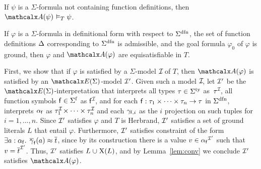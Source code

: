 \begin{lemma}\label{lem:conv2}
If $\psi$ is a $\Sigma$-formula not containing function definitions, 
then $\conv( \psi ) \models_T\psi$.
\end{lemma}

\begin{theorem}\label{thm:equi}
If $\varphi$ is a\/ $\Sigma$-formula in definitional form with respect to\/
$\sfundefs{\Sigma}$,
the set of function definitions\/ $\DDD$ corresponding to\/
$\sfundefs{\Sigma}$ is admissible, 
and the goal formula $\varphi_0$ of $\varphi$ is ground,
then\/ $\varphi$ and\/ $\conv( \varphi )$ are
equisatisfiable in $T$.
\end{theorem}
\begin{proofsketch}
First, we show that if $\varphi$ is satisfied by a
$\Sigma$-model $\mathcal{I\!}$ of $T$, then $\conv( \varphi )$ is satisfied by an $\extendsig{\Sigma}$-model ${\mathcal{I}'}$.
Given such a model $\mathcal{I\!}$, let ${\mathcal{I}'}$ be the $\extendsig{\Sigma}$-interpretation that interprets all types $\tau \in \stypes{\Sigma}$ as~$\tau^{\mathcal{I\!}}$,
all function symbols $\con{f} \in \sfuns{\Sigma}$ as $\mathsf{f}^{\mathcal{I\!}}$,
and for each $\mathsf{f} : \tau_1 \times \cdots \times \tau_n \rightarrow \tau$ in $\sfundefs{\Sigma}$,
interprets $\alpha_{\mathsf{f}}$ as $\tau_1^{\mathcal{I\!}} \times \cdots \times \tau_n^{\mathcal{I\!}}$
and each $\gamma_{\mathsf{f},i}$ as the $i$ projection on such tuples for $i = 1, \dotsc, n$.
Since ${\mathcal{I}'}$ satisfies $\varphi$ and $T$ is Herbrand, ${\mathcal{I}'}$ satisfies a set of ground literals $L$ that entail $\varphi$.
Furthermore, ${\mathcal{I}'}$ satisfies  constraint of the form $\exists a : {\alpha_{\mathsf{f}}}.\;\, \overline{\gamma}_{\mathsf{f}}( a ) \approx \overline{t}$,
since by its construction there is a value $v \in {\alpha_{\mathsf{f}}}^{\mathcal{I}'}$ such that $v = \overline{t}^{\mathcal{I}'}$.
Thus, ${\mathcal{I}'}$ satisfies $L \cup \absconstraints( L )$, and by Lemma~\ref{lem:conv}
we conclude ${\mathcal{I}'}$ satisfies $\conv( \varphi )$.


\end{proofsketch}
